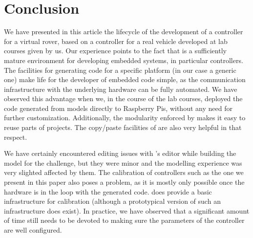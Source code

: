 \section{Conclusion}
\label{sec:conclusion}

We have presented in this article the lifecycle of the development of
a controller for a virtual rover, based on a controller for a real vehicle
developed at lab courses given by us. Our experience points to the fact that \af is
a sufficiently mature environment for developing embedded systems, in
particular controllers. The facilities for generating code for a specific platform (in our case a generic one) make life
for the developer of embedded code simple, as the communication infrastructure
with the underlying hardware can be fully automated. We have observed this
advantage when we, in the course of the lab courses, deployed the code
generated from models directly to Raspberry Pis, without any need for further customization. Additionally, the modularity enforced by \af
makes it easy to reuse parts of projects. The copy/paste facilities of \af are
also very helpful in that respect.

We have certainly encountered editing issues with \af's editor while building
the model for the challenge, but they were minor and the modelling experience
was very slighted affected by them. The calibration of controllers such as the
one we present in this paper also poses a problem, as it is mostly only
possible once the hardware is in the loop with the generated code. \af does
provide a basic infrastructure for calibration (although a prototypical version
of such an infrastructure does exist). In practice, we have observed that a
significant amount of time still needs to be devoted to making sure the
parameters of the controller are well configured.
